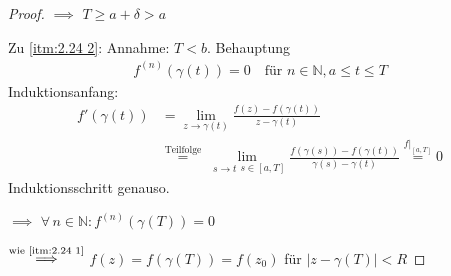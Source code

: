 \begin{theorem}[Satz]
\begin{proof}
    $\implies$ $T \geq a + \delta > a$
    
    Zu \ref{itm:2.24 2}: Annahme: $T < b$. Behauptung
    \begin{align*}
      f^{(n)} (\gamma(t)) = 0 \quad \text{für } n \in \mathbb{N}, a \leq t \leq T
    \end{align*}
    Induktionsanfang:
    \begin{align*}
      f'(\gamma(t)) &= \lim\limits_{z \to \gamma(t)} \frac{f(z) - f(\gamma(t))}{z - \gamma(t)} \\
      &\overset{\text{Teilfolge}}{=} \lim\limits_{\substack{s \to t}{s \in [a,T]}} \frac{f(\gamma(s)) - f(\gamma(t))}{\gamma(s) - \gamma(t)} \overset{f|_{[a,T]}}{=} 0
    \end{align*}
    Induktionsschritt genauso.
    
    $\implies$ $\forall \, n \in \mathbb{N} : f^{(n)}(\gamma(T)) = 0$
    
    $\overset{\text{wie \ref{itm:2.24 1}}}{\implies}$ $f(z) = f(\gamma(T)) = f(z_0)$ für $|z-\gamma(T)| < R$
  \end{proof}
\end{theorem}
